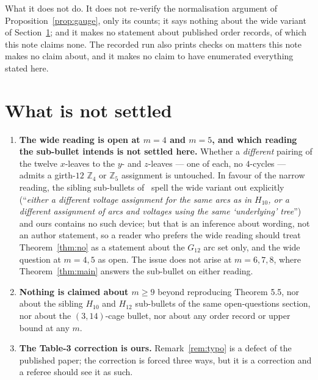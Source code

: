 \documentclass[11pt]{amsart}
\theoremstyle{remark}
\newcommand{\Gt}{G_{12}}
\begin{document}
What it does not do. It does not re-verify the normalisation argument of
Proposition~\ref{prop:gauge}, only its counts; it says nothing about the wide
variant of Section~\ref{sec:open}; and it makes no statement about published
order records, of which this note claims none. The recorded run also prints
checks on matters this note makes no claim about, and it makes no claim to have
enumerated everything stated here.

\section{What is not settled}\label{sec:open}

\begin{enumerate}
\item \textbf{The wide reading is open at $m = 4$ and $m = 5$, and which reading
the sub-bullet intends is not settled here.}
Whether a \emph{different} pairing of the twelve $x$-leaves to
the $y$- and $z$-leaves --- one of each, no $4$-cycles --- admits a girth-$12$
$\mathbb{Z}_4$ or $\mathbb{Z}_5$ assignment is untouched. In favour of the narrow
reading, the sibling sub-bullets of~\cite[p.~28--29]{AAB} spell the wide variant
out explicitly (``\emph{either a different voltage assignment for the same arcs
as in $H_{10}$, or a different assignment of arcs and voltages using the same
`underlying' tree}'') and ours contains no such device; but that is an inference
about wording, not an author statement, so a reader who prefers the wide reading
should treat Theorem~\ref{thm:no} as a statement about the $\Gt$ arc set only,
and the wide question at $m = 4, 5$ as open. The issue does not arise at
$m = 6, 7, 8$, where Theorem~\ref{thm:main} answers the sub-bullet on either
reading.
\item \textbf{Nothing is claimed about $m \ge 9$} beyond reproducing Theorem 5.5,
nor about the sibling $H_{10}$ and $H_{12}$ sub-bullets of the same
open-questions section, nor about the $(3,14)$-cage bullet, nor about any order
record or upper bound at any $m$.
\item \textbf{The Table-3 correction is ours.} Remark~\ref{rem:typo} is a
defect of the published paper; the correction is forced three ways, but it is
a correction and a referee should see it as such.
\end{enumerate}
\end{document}
